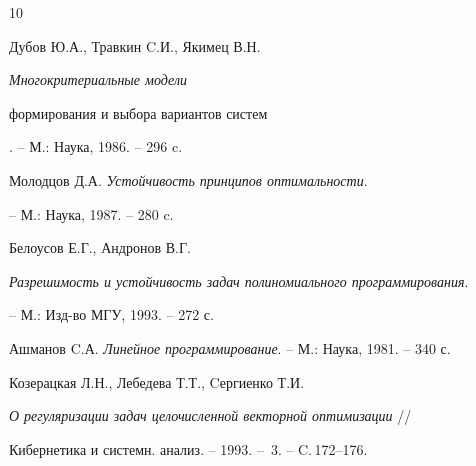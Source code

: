 \begin{thebibliography}{10}


Дубов Ю.А., Травкин C.И., Якимец В.Н. {\em Многокритериальные модели


формирования и выбора вариантов систем}. -- М.: Наука, 1986. -- 296 c.







Молодцов Д.А. {\em Устойчивость принципов оптимальности}.


-- М.: Наука, 1987. -- 280 c.







Белоусов Е.Г., Андронов В.Г.


{\em Разрешимость и устойчивость задач полиномиального программирования}.


-- М.: Изд-во МГУ, 1993. -- 272 с.







Ашманов C.А. {\em Линейное программирование}. -- М.: Наука, 1981. -- 340 с.







Козерацкая Л.Н., Лебедева Т.Т., Cергиенко Т.И.


{\em О регуляризации задач целочисленной векторной оптимизации} //


Кибернетика и системн. анализ. -- 1993. -- \No\,3. -- C.\,172--176.





\end{thebibliography}





\vskip 2cm














\label{end}





